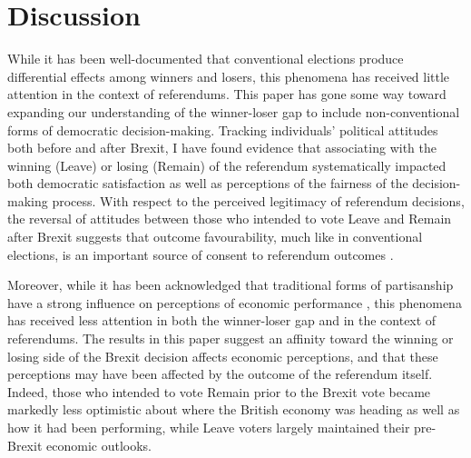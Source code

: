 \documentclass[12pt, letter]{article}
\begin{document}
\section{Discussion}

While it has been well-documented that conventional elections produce differential effects among winners and losers, this phenomena has received little attention in the context of referendums. This paper has gone some way toward expanding our understanding of the winner-loser gap to include non-conventional forms of democratic decision-making. Tracking individuals' political attitudes both before and after Brexit, I have found evidence that associating with the winning (Leave) or losing (Remain) of the referendum systematically impacted both democratic satisfaction as well as perceptions of the fairness of the decision-making process. With respect to the perceived legitimacy of referendum decisions, the reversal of attitudes between those who intended to vote Leave and Remain after Brexit suggests that outcome favourability, much like in conventional elections, is an important source of consent to referendum outcomes \parencite{nadeau1993accepting}.

Moreover, while it has been acknowledged that traditional forms of partisanship have a strong influence on perceptions of economic performance \parencite{wlezien1997economic, anderson2007end, bartels2002beyond}, this phenomena has received less attention in both the winner-loser gap and in the context of referendums. The results in this paper suggest an affinity toward the winning or losing side of the Brexit decision affects economic perceptions, and that these perceptions may have been affected by the outcome of the referendum itself. Indeed, those who intended to vote Remain prior to the Brexit vote became markedly less optimistic about where the British economy was heading as well as how it had been performing, while Leave voters largely maintained their pre-Brexit economic outlooks. 
\end{document}
